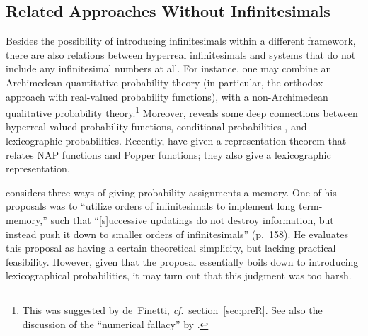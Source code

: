 \subsection{Related Approaches Without Infinitesimals}
Besides the possibility of introducing infinitesimals within a different framework, there are also relations between hyperreal infinitesimals and systems that do not include any infinitesimal numbers at all. For instance, one may combine an Archimedean quantitative probability theory (in particular, the orthodox approach with real-valued probability functions), with a non-Archimedean qualitative probability theory.\footnote{This was suggested by de~Finetti, \textit{cf}.\ section~\ref{sec:preR}. See also the discussion of the ``numerical fallacy'' by \citet{Easwaran:2014}.} Moreover, \citet{Halpern:2010} reveals some deep connections between hyperreal-valued probability functions, conditional probabilities \citep[including Popper functions; see also Vann][]{McGee:1994}, and lexicographic probabilities. Recently, \citet{BrickhillHorsten:2018} have given a representation theorem that relates NAP functions and Popper functions; they also give a lexicographic representation.

\citet{Skyrms:1983b} considers three ways of giving probability assignments a memory. One of his proposals was to ``utilize orders of infinitesimals to implement long term-memory,'' such that ``[s]uccessive updatings do not destroy information, but instead push it down to smaller orders of infinitesimals'' (p.~158).
He evaluates this proposal as having a certain theoretical simplicity, but lacking practical feasibility. However, given that the proposal essentially boils down to introducing lexicographical probabilities, it may turn out that this judgment was too harsh.


